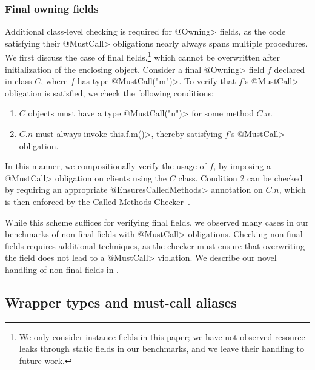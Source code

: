 
\subsubsection{Final owning fields}
\label{sec:owning-fields}

  Additional class-level checking is required for \<@Owning> fields, as the code
  satisfying their \<@MustCall> obligations nearly always spans multiple
  procedures.  We first discuss the case of final fields,\footnote{We only
  consider instance fields in this paper; we have not observed resource leaks
  through static fields in our benchmarks, and we leave their handling to future
  work.} which cannot be overwritten after initialization of the enclosing
  object.  Consider a final \<@Owning> field $f$ declared in class $C$, where
  $f$ has type \<@MustCall("m")>.  To
  verify that $f$'s \<@MustCall> obligation is satisfied, we check the following
  conditions:
  \begin{enumerate}
    \item $C$ objects must have a type \<@MustCall("n")> for some method $C.n$.
    \item $C.n$ must always invoke \<this.f.m()>, thereby satisfying $f$'s
    \<@MustCall> obligation.
  \end{enumerate}
  In this manner, we compositionally verify the usage of $f$, by imposing
  a \<@MustCall> obligation on clients using the $C$ class.  Condition 2 can be
  checked by requiring an appropriate \<@EnsuresCalledMethods> annotation on
  $C.n$, which is then enforced by the Called Methods
  Checker~\cite{kellogg20verifying}.  

  While this scheme suffices for verifying final fields, we observed many cases
  in our benchmarks of non-final fields with \<@MustCall> obligations.  Checking
  non-final fields requires additional techniques, as the checker must ensure
  that overwriting the field does not lead to a \<@MustCall> violation.  We
  describe our novel handling of non-final fields in .

\subsection{Wrapper types and must-call aliases}
\label{sec:must-call-choice}

